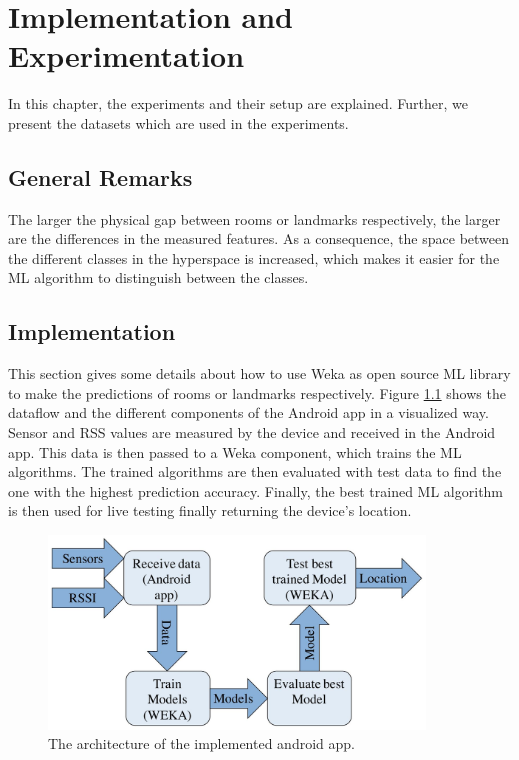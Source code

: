
\chapter{Implementation and Experimentation} %
\label{Chapter3} %



In this chapter, the experiments and their setup are explained. Further, we present the datasets which are used in the experiments.

\section{General Remarks}The larger the physical gap between rooms or landmarks respectively, the larger are the differences in the measured features. As a consequence, the space between the different classes in the hyperspace is increased, which makes it easier for the ML algorithm to distinguish between the classes.

\section{Implementation}
This section gives some details about how to use Weka as open source ML library to make the predictions of rooms or landmarks respectively. Figure \ref{fig:Architecture} shows the dataflow and the different components of the Android app in a visualized way. Sensor and RSS values are measured by the device and received in the Android app. This data is then passed to a Weka component, which trains the ML algorithms. The trained algorithms are then evaluated with test data to find the one with the highest prediction accuracy. Finally, the best trained ML algorithm is then used for live testing finally returning the device's location.

\begin{figure}[H]
\centering
\includegraphics[width=100mm]{Figures/Architecture.jpg}
\decoRule
\caption[Architecture]{The architecture of the implemented android app.}
\label{fig:Architecture}
\end{figure}

